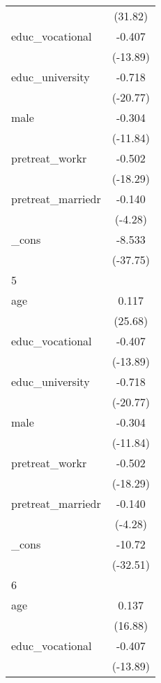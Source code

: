 {\begin{tabular}{l*{1}{c}}
            &     (31.82)         \\
[1em]
educ\_vocational&      -0.407\sym{***}\\
            &    (-13.89)         \\
[1em]
educ\_university&      -0.718\sym{***}\\
            &    (-20.77)         \\
[1em]
male        &      -0.304\sym{***}\\
            &    (-11.84)         \\
[1em]
pretreat\_workr&      -0.502\sym{***}\\
            &    (-18.29)         \\
[1em]
pretreat\_marriedr&      -0.140\sym{***}\\
            &     (-4.28)         \\
[1em]
\_cons      &      -8.533\sym{***}\\
            &    (-37.75)         \\
\hline
5           &                     \\
age         &       0.117\sym{***}\\
            &     (25.68)         \\
[1em]
educ\_vocational&      -0.407\sym{***}\\
            &    (-13.89)         \\
[1em]
educ\_university&      -0.718\sym{***}\\
            &    (-20.77)         \\
[1em]
male        &      -0.304\sym{***}\\
            &    (-11.84)         \\
[1em]
pretreat\_workr&      -0.502\sym{***}\\
            &    (-18.29)         \\
[1em]
pretreat\_marriedr&      -0.140\sym{***}\\
            &     (-4.28)         \\
[1em]
\_cons      &      -10.72\sym{***}\\
            &    (-32.51)         \\
\hline
6           &                     \\
age         &       0.137\sym{***}\\
            &     (16.88)         \\
[1em]
educ\_vocational&      -0.407\sym{***}\\
            &    (-13.89)         \\

\end{tabular}}

